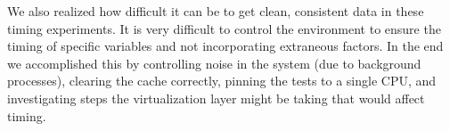 \documentclass[letterpaper,twocolumn,10pt]{article}
\begin{document}
We also realized how difficult it can be to get clean, consistent data in these timing experiments.
It is very difficult to control the environment to ensure the timing of specific variables and not incorporating extraneous factors.
In the end we accomplished this by controlling noise in the system (due to background processes), clearing the cache correctly, pinning the tests to a single CPU, and investigating steps the virtualization layer might be taking that would affect timing. 


\end{document}
